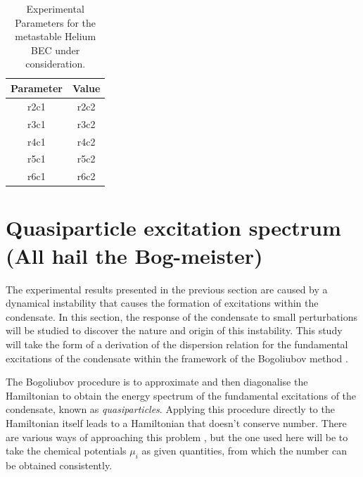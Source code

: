 \begin{table}
    \centering
    \begin{tabular}{cc}
    \toprule
    Parameter & Value\\
    \midrule
    r2c1 & r2c2\\
    r3c1 & r3c2\\
    r4c1 & r4c2\\
    r5c1 & r5c2\\
    r6c1 & r6c2\\
    \bottomrule
    \end{tabular}
    \caption{Experimental Parameters for the metastable Helium BEC under consideration.}
    \label{Peaks:ExperimentalParameters}
\end{table}





\section{Quasiparticle excitation spectrum (All hail the Bog-meister)}


The experimental results presented in the previous section are caused by a dynamical instability that causes the formation of excitations within the condensate.  In this section, the response of the condensate to small perturbations will be studied to discover the nature and origin of this instability. This study will take the form of a derivation of the dispersion relation for the fundamental excitations of the condensate within the framework of the Bogoliubov method \citep{Bogoliubov:1947,FetterWalecka}.

The Bogoliubov procedure \citep{Bogoliubov:1947} is to approximate and then diagonalise the Hamiltonian to obtain the energy spectrum of the fundamental excitations of the condensate, known as \emph{quasiparticles}.  Applying this procedure directly to the Hamiltonian itself leads to a Hamiltonian that doesn't conserve number. There are various ways of approaching this problem \citep{FetterWalecka}, but the one used here will be to take the chemical potentials $\mu_i$ as given quantities, from which the number can be obtained consistently.

